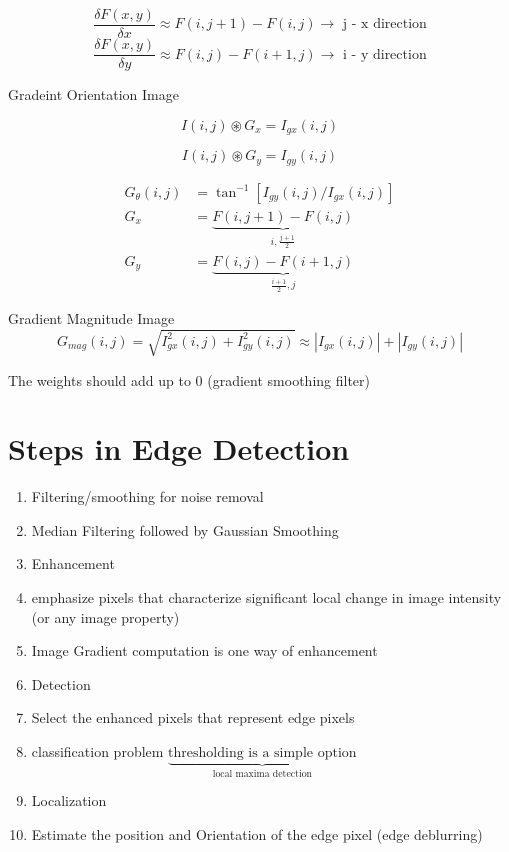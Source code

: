 \documentclass[11pt]{article}
\theoremstyle{definition}
\begin{document}
\[
\frac{\delta F(x,y)}{\delta x} \approx F(i, j+1) - F(i, j) \longrightarrow \text{ j - x direction}
\]
\[
\frac{\delta F(x,y)}{\delta y} \approx F(i, j) - F(i+1, j) \longrightarrow \text{ i - y direction}
\]

Gradeint Orientation Image

\[
I(i,j) \circledast G_x = I_{gx}(i,j)
\]

\[
I(i,j) \circledast G_y  = I_{gy}(i,j)
\]

\begin{equation}
    \begin{aligned}
        G_{\theta}(i, j) &= \tan^{-1} \left[I_{gy}(i,j)/I_{gx}(i,j)\right]\\
        G_x &= \underbrace{F(i, j+1) - F(i, j)}_{i, \frac{j+1}{2}}\\
        G_y &= \underbrace{F(i, j) - F(i+1, j)}_{\frac{i+1}{2}, j}
    \end{aligned} 
\end{equation}

Gradient Magnitude Image
\[
G_{mag} (i,j) = \sqrt{I_{gx}^{2}(i,j) + I_{gy}^{2}(i,j)}  \approx \left|I_{gx}(i,j)\right| + \left|I_{gy}(i,j)\right|
\]

The weights should add up to 0 (gradient smoothing filter)
\newpage
\section{Steps in Edge Detection}

\begin{enumerate}
    \item Filtering/smoothing for noise removal
    \item[-] Median Filtering followed by Gaussian Smoothing
    \item Enhancement
    \item[-] emphasize pixels that characterize significant local change in image intensity (or any image property)
    \item[-] Image Gradient computation is one way of enhancement
    \item Detection
    \item[-] Select the enhanced pixels that represent edge pixels
    \item[-] classification problem $\underbrace{\text{thresholding is a simple option}}_{\text{local maxima detection}}$
    \item[] Localization 
    \item[-] Estimate the position and Orientation of the edge pixel (edge deblurring) 
\end{enumerate}
\end{document}

